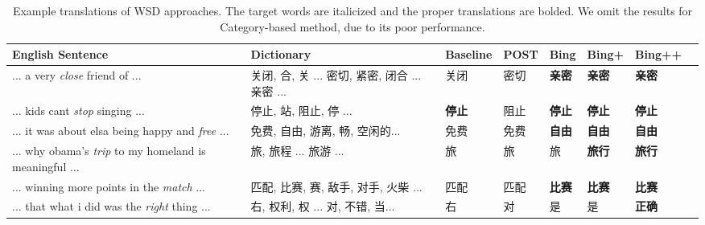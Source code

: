 \begin{CJK}{UTF8}{gbsn}
\begin{table*}[t]
  \caption{Example translations of WSD approaches. The target words are italicized and the proper translations are bolded.  We omit the results for Category-based method, due to its poor performance.}
  \label{table:wsd_1}
  \begin{center}
  \begin{tabular}{| p{3.5cm} | p{3.5cm} | p{1.2cm} | p{1cm} | p{1.3cm}| p{0.8cm} | p{0.9cm} | p{1cm} |}
    \hline
    English Sentence & Dictionary & Baseline & POST & Bing & Bing+ & Bing++ \\
    \hline
    ... a very \textit{close} friend of ... & \parbox[t]{3cm}{关闭, 合, 关 ... 密切, 紧密, 闭合 ... 亲密 ...} & 关闭 & 密切 & {\bf 亲密} & {\bf 亲密} & {\bf 亲密} \\
    \hline
    ... kids cant \textit{stop} singing ... & \parbox[t]{3cm}{停止, 站, 阻止, 停 ...} & {\bf 停止} & 阻止 & {\bf 停止} & {\bf 停止} & {\bf 停止} \\
    \hline
    ... it was about elsa being happy and \textit{free} ... & \parbox[t]{3cm}{免费, 自由, 游离, 畅, 空闲的...} & 免费 & 免费 & {\bf 自由} & {\bf 自由} & {\bf 自由} \\
    \hline
    ... why obama's \textit{trip} to my homeland is meaningful ... & \parbox[t]{3cm}{旅, 旅程 ... 旅游 ...} & 旅 & 旅 & 旅 & {\bf 旅行} & {\bf 旅行} \\
    \hline
    ... winning more points in the \textit{match} ... & \parbox[t]{3cm}{匹配, 比赛, 赛, 敌手, 对手, 火柴 ...} & 匹配 & 匹配 & {\bf 比赛} & {\bf 比赛} & {\bf 比赛} \\
    \hline
    ... that what i did was the \textit{right} thing ... & \parbox[t]{3cm}{右, 权利, 权 ... 对, 不错, 当...} & 右 & 对 & 是 & 是 & {\bf 正确} \\
    \hline
    \end{tabular}
  \end{center}
\end{table*}




\end{CJK}
